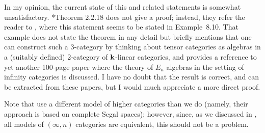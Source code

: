 \begin{remark}
  In my opinion, the current state of this and related statements is somewhat
  unsatisfactory. *{Theorem 2.2.18} does not give a
  proof; instead, they refer the reader to , where this statement
  seems to be stated in Example~8.10. That example does not state the theorem in
  any detail but briefly mentions that one can construct such a 3-category by
  thinking about tensor categories as algebras in a (suitably defined)
  2-category of $\mathbf{k}$-linear categories, and provides a reference to yet another
  100-page paper where the theory of $E_n$ algebras in the setting of infinity
  categories is discussed. I have no doubt that the result is correct, and
  can be extracted from these papers, but I would much appreciate a
  more direct proof.
\end{remark}


Note that  use a different model of higher categories than we do
(namely, their approach is based on complete Segal spaces); however, since, as
we discussed in , all models of $(\infty,n)$ categories are equivalent,
this should not be a problem.
